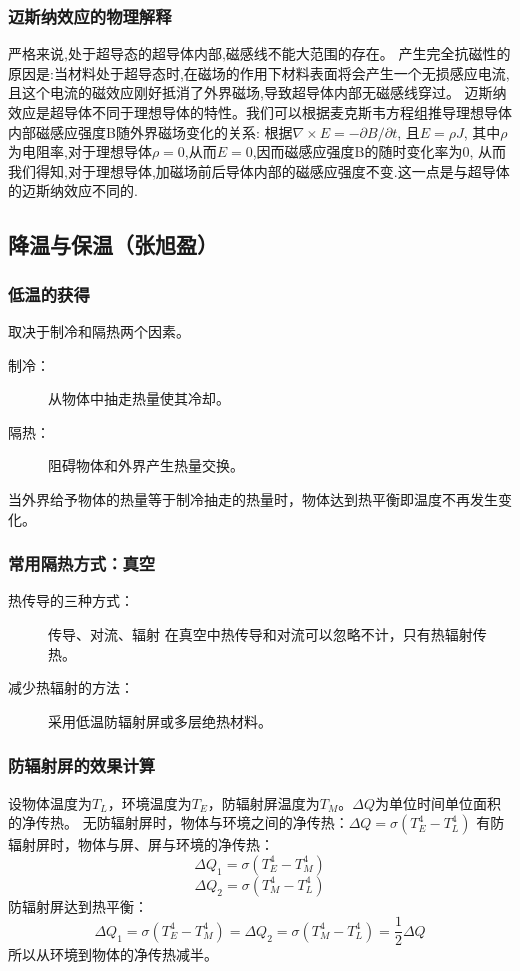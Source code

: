 \documentclass{spaexp}
\begin{document}
            \subsubsection{迈斯纳效应的物理解释}
                严格来说,处于超导态的超导体内部,磁感线不能大范围的存在。
                产生完全抗磁性的原因是:当材料处于超导态时,在磁场的作用下材料表面将会产生一个无损感应电流,且这个电流的磁效应刚好抵消了外界磁场,导致超导体内部无磁感线穿过。
                迈斯纳效应是超导体不同于理想导体的特性。我们可以根据麦克斯韦方程组推导理想导体内部磁感应强度B随外界磁场变化的关系:
                根据$\nabla \times E = -\partial B / \partial t$, 且$E=\rho J$, 其中$\rho$为电阻率,对于理想导体$\rho=0$,从而$E=0$,因而磁感应强度B的随时变化率为0,
                从而我们得知,对于理想导体,加磁场前后导体内部的磁感应强度不变.这一点是与超导体的迈斯纳效应不同的.

        \subsection{降温与保温（张旭盈）}
            \subsubsection{低温的获得}
                取决于制冷和隔热两个因素。
                \begin{description}
                    \item[制冷：]从物体中抽走热量使其冷却。
                    \item[隔热：]阻碍物体和外界产生热量交换。
                \end{description}
                当外界给予物体的热量等于制冷抽走的热量时，物体达到热平衡即温度不再发生变化。
                
            \subsubsection{常用隔热方式：真空}
                \begin{description}
                    \item[热传导的三种方式：]传导、对流、辐射
                    在真空中热传导和对流可以忽略不计，只有热辐射传热。
                    \item[减少热辐射的方法：]采用低温防辐射屏或多层绝热材料。
                \end{description}
            \subsubsection{防辐射屏的效果计算}
                设物体温度为$T_L$，环境温度为$T_E$，防辐射屏温度为$T_M$。$\Delta Q$为单位时间单位面积的净传热。
                无防辐射屏时，物体与环境之间的净传热：$\Delta Q = \sigma(T_E^4 - T_L^4)$
                有防辐射屏时，物体与屏、屏与环境的净传热：
                $$\Delta Q_1 = \sigma(T_E^4 - T_M^4)$$
                $$\Delta Q_2 = \sigma(T_M^4 - T_L^4)$$
                防辐射屏达到热平衡：
                $$\Delta Q_1 = \sigma(T_E^4 - T_M^4) = \Delta Q_2 = \sigma(T_M^4 - T_L^4) = \frac12 \Delta Q$$
                所以从环境到物体的净传热减半。
\end{document}
